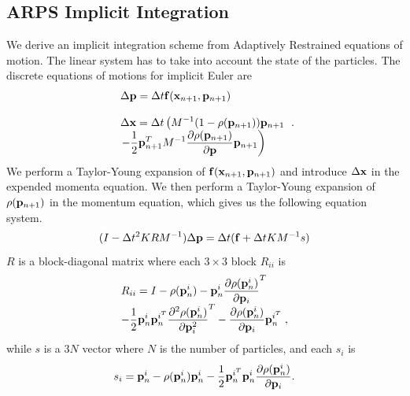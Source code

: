 \subsection{ ARPS Implicit Integration }
We derive an implicit integration scheme from Adaptively Restrained equations of motion.
The linear system has to take into account the state of the particles.
The discrete equations of motions for implicit Euler are
\begin{equation}
	\label{eq:implicitEqMotion}
	\begin{array}{l}
	\displaystyle \Delta \mathbf{p} =  \Delta t \mathbf{f}(\mathbf{x}_{n+1}, \mathbf{p}_{n+1})\\
				\\
	\displaystyle \Delta \mathbf{x} = \Delta t \left( M^{-1}(1-\rho(\mathbf{p}_{n+1}))\mathbf{p}_{n+1} \right. \\
	\displaystyle \left. - \frac{1}{2}\mathbf{p}_{n+1}^{T} M^{-1} \frac{\partial \rho(\mathbf{p}_{n+1})}{\partial \mathbf{p}}\mathbf{p}_{n+1} \right)
	\end{array}
    .
\end{equation}
We perform a Taylor-Young expansion of $\mathbf{f}(\mathbf{x}_{n+1}, \mathbf{p}_{n+1})$ and introduce $\Delta \mathbf{x}$ in the expended momenta equation.
We then perform a Taylor-Young expansion of $\rho(\mathbf{p}_{n+1})$ in the momentum equation, which gives us the following equation system.
\begin{equation}
	\label{eq:arpsLinearSystem}
	( I -\Delta t^{2}KRM^{-1} ) \Delta \mathbf{p} = \Delta t( \mathbf{f} + \Delta t KM^{-1}s )
\end{equation}
$R$ is a block-diagonal matrix where each $3\times 3$ block $R_{ii}$ is
\begin{equation}
	\label{eq:Ri}
	\begin{array}{l}
	\displaystyle R_{ii} = I - \rho(\mathbf{p}^{i}_{n}) - \mathbf{p}^{i}_{n} \frac{\partial \rho(\mathbf{p}^{i}_{n})}{\partial \mathbf{p}_{i}}^{T} \\
	\displaystyle - \frac{1}{2}\mathbf{p}^{i}_{n}\mathbf{p}^{i^{T}}_{n}\frac{\partial^{2} \rho(\mathbf{p}^{i}_{n})}{\partial \mathbf{p}_{i}^{2}}^{T} -
	\displaystyle \frac{\partial \rho(\mathbf{p}^{i}_{n})}{\partial \mathbf{p}_{i}} \mathbf{p}^{i^{T}}_{n} \;,
	\end{array}
\end{equation}
while $s$ is a $3N$ vector where $N$ is the number of particles, and each $s_{i}$ is
\begin{equation}
	\label{eq:si}
	\displaystyle s_{i} = \mathbf{p}^{i}_{n} - \rho(\mathbf{p}^{i}_{n})\mathbf{p}^{i}_{n} - \frac{1}{2	}\mathbf{p}^{i^{T}}_{n}\mathbf{p}^{i}_{n}\frac{\partial \rho(\mathbf{p}^{i}_{n})}{\partial \mathbf{p}_{i}}.
\end{equation}
